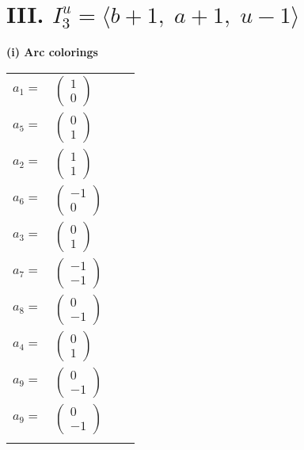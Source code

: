 \documentclass[1p]{elsarticle_modified}
\theoremstyle{definition}
\begin{document}
\centering \section*{III. $I^u_{3}= \langle b+1,\;a+1,\;u-1 \rangle$}
\flushleft \textbf{(i) Arc colorings}\\
\begin{tabular}{m{7pt} m{180pt} m{7pt} m{180pt} }
\flushright $a_{1}=$&$\begin{pmatrix}1\\0\end{pmatrix}$ \\
\flushright $a_{5}=$&$\begin{pmatrix}0\\1\end{pmatrix}$ \\
\flushright $a_{2}=$&$\begin{pmatrix}1\\1\end{pmatrix}$ \\
\flushright $a_{6}=$&$\begin{pmatrix}-1\\0\end{pmatrix}$ \\
\flushright $a_{3}=$&$\begin{pmatrix}0\\1\end{pmatrix}$ \\
\flushright $a_{7}=$&$\begin{pmatrix}-1\\-1\end{pmatrix}$ \\
\flushright $a_{8}=$&$\begin{pmatrix}0\\-1\end{pmatrix}$ \\
\flushright $a_{4}=$&$\begin{pmatrix}0\\1\end{pmatrix}$ \\
\flushright $a_{9}=$&$\begin{pmatrix}0\\-1\end{pmatrix}$\\ \flushright $a_{9}=$&$\begin{pmatrix}0\\-1\end{pmatrix}$\\&\end{tabular}
\end{document}

